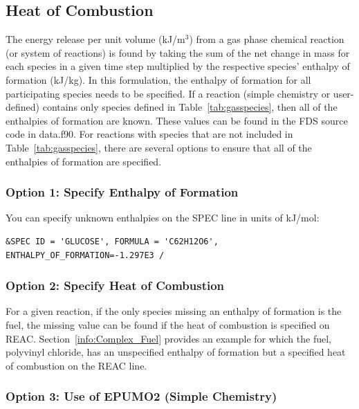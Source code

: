 \documentclass[11pt]{book}
\begin{document}
\subsection{Heat of Combustion}
\label{info:heat_of_combustion}

The energy release per unit volume (kJ/m$^3$) from a gas phase chemical reaction (or system of reactions) is found by taking the sum of the net change in mass for each species in a given time step multiplied by the respective species' enthalpy of formation (kJ/kg). In this formulation, the enthalpy of formation for all participating species needs to be specified. If a reaction (simple chemistry or user-defined) contains only species defined in Table~\ref{tab:gasspecies}, then all of the enthalpies of formation are known. These values can be found in the FDS source code in data.f90. For reactions with species that are not included in Table~\ref{tab:gasspecies}, there are several options to ensure that all of the enthalpies of formation are specified.

\subsubsection{Option 1: Specify Enthalpy of Formation}

You can specify unknown enthalpies on the {\ct SPEC} line in units of kJ/mol:
\begin{lstlisting}
&SPEC ID = 'GLUCOSE', FORMULA = 'C62H12O6', ENTHALPY_OF_FORMATION=-1.297E3 /
\end{lstlisting}

\subsubsection{Option 2: Specify Heat of Combustion}

For a given reaction, if the only species missing an enthalpy of formation is the fuel, the missing value can be found if the heat of combustion is specified on {\ct REAC}. Section~\ref{info:Complex_Fuel} provides an example for which the fuel, polyvinyl chloride, has an unspecified enthalpy of formation but a specified heat of combustion on the {\ct REAC} line.

\subsubsection{Option 3: Use of EPUMO2 (Simple Chemistry)}
\end{document}
